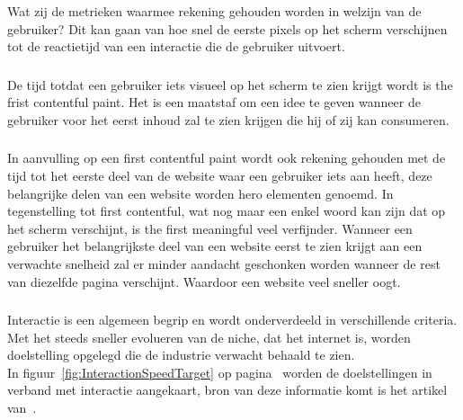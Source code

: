 Wat zij de metrieken waarmee rekening gehouden worden in welzijn van de gebruiker? Dit kan gaan van hoe snel de eerste pixels op het scherm verschijnen tot de reactietijd van een interactie die de gebruiker uitvoert.

\subsubsection{}
\label{sec:fcp}

De tijd totdat een gebruiker iets visueel op het scherm te zien krijgt wordt is the frist contentful paint. Het is een maatstaf om een idee te geven wanneer de gebruiker voor het eerst inhoud zal te zien krijgen die hij of zij kan consumeren. 

\subsubsection{}
\label{sec:fmp}

In aanvulling op een first contentful paint wordt ook rekening gehouden met de tijd tot het eerste deel van de website waar een gebruiker iets aan heeft, deze belangrijke delen van een website worden hero elementen genoemd. In tegenstelling tot first contentful, wat nog maar een enkel woord kan zijn dat op het scherm verschijnt, is the first meaningful veel verfijnder. Wanneer een gebruiker het belangrijkste deel van een website eerst te zien krijgt aan een verwachte snelheid zal er minder aandacht geschonken worden wanneer de rest van diezelfde pagina verschijnt. Waardoor een website veel sneller oogt.

\subsubsection{}
\label{sec:interaction}

Interactie is een algemeen begrip en wordt onderverdeeld in verschillende criteria. Met het steeds sneller evolueren van de niche, dat het internet is, worden doelstelling opgelegd die de industrie verwacht behaald te zien. \\ 
In figuur~\ref{fig:InteractionSpeedTarget} op pagina~\pageref{fig:InteractionSpeedTarget} worden de doelstellingen in verband met interactie aangekaart, bron van deze informatie komt is het artikel van~\textcite{Taub2017}.

